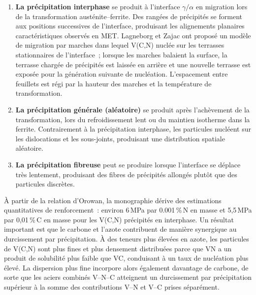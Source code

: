 \documentclass[11pt,a4paper]{article}
\begin{document}
\begin{enumerate}
  \item \textbf{La pr\'ecipitation interphase} se produit \`a
    l'interface $\gamma/\alpha$ en migration lors de la transformation
    aust\'enite--ferrite.  Des rang\'ees de pr\'ecipit\'es se forment
    aux positions successives de l'interface, produisant les alignements
    planaires caract\'eristiques observ\'es en MET.  Lagneborg et Zajac
    \cite{LagneborgZajac2001} ont propos\'e un mod\`ele de migration par
    marches dans lequel V(C,N) nucl\'ee sur les terrasses stationnaires
    de l'interface~; lorsque les marches balaient la surface, la terrasse
    charg\'ee de pr\'ecipit\'es est laiss\'ee en arri\`ere et une
    nouvelle terrasse est expos\'ee pour la g\'en\'eration suivante de
    nucl\'eation.  L'espacement entre feuillets est r\'egi par la
    hauteur des marches et la temp\'erature de transformation.

  \item \textbf{La pr\'ecipitation g\'en\'erale (al\'eatoire)} se
    produit apr\`es l'ach\`evement de la transformation, lors du
    refroidissement lent ou du maintien isotherme dans la ferrite.
    Contrairement \`a la pr\'ecipitation interphase, les particules
    nucl\'eent sur les dislocations et les sous-joints, produisant une
    distribution spatiale al\'eatoire.

  \item \textbf{La pr\'ecipitation fibreuse} peut se produire lorsque
    l'interface se d\'eplace tr\`es lentement, produisant des fibres de
    pr\'ecipit\'es allong\'es plut\^ot que des particules discr\`etes.
\end{enumerate}

\`A partir de la relation d'Orowan, la monographie d\'erive des
estimations quantitatives de renforcement~: environ 6\,MPa par
0.001\,\%\,N en masse et 5,5\,MPa par 0,01\,\%\,C en masse pour les
V(C,N) pr\'ecipit\'es en interphase.  Un r\'esultat important est que
le carbone et l'azote contribuent de mani\`ere synergique au
durcissement par pr\'ecipitation.  \`A des teneurs plus \'elev\'ees en
azote, les particules de V(C,N) sont plus fines et plus densement
distribu\'ees parce que VN a un produit de solubilit\'e plus faible que
VC, conduisant \`a un taux de nucl\'eation plus \'elev\'e.  La
dispersion plus fine incorpore alors \'egalement davantage de carbone,
de sorte que les aciers combin\'es V--N--C atteignent un durcissement
par pr\'ecipitation sup\'erieur \`a la somme des contributions V--N et
V--C prises s\'epar\'ement.
\end{document}

